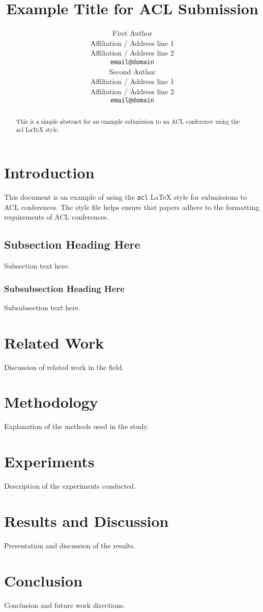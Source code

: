 \documentclass[11pt,a4paper]{article}
\title{Example Title for ACL Submission}
\author{First Author \\
    Affiliation / Address line 1 \\
    Affiliation / Address line 2 \\
    \texttt{email@domain} \\\And
    Second Author \\
    Affiliation / Address line 1 \\
    Affiliation / Address line 2 \\
    \texttt{email@domain} \\}
\date{}
\begin{document}
\maketitle
\begin{abstract}
This is a simple abstract for an example submission to an ACL conference using the acl LaTeX style.
\end{abstract}

\section{Introduction}
This document is an example of using the \texttt{acl} LaTeX style for submissions to ACL conferences. The style file helps ensure that papers adhere to the formatting requirements of ACL conferences.

\subsection{Subsection Heading Here}
Subsection text here.

\subsubsection{Subsubsection Heading Here}
Subsubsection text here.

\section{Related Work}
Discussion of related work in the field.

\section{Methodology}
Explanation of the methods used in the study.

\section{Experiments}
Description of the experiments conducted.

\section{Results and Discussion}
Presentation and discussion of the results.

\section{Conclusion}
Conclusion and future work directions.



\end{document}
